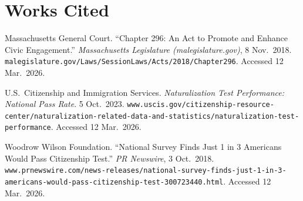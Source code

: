 \documentclass[12pt]{article}
\begin{document}
\section*{Works Cited}

Massachusetts General Court. ``Chapter 296: An Act to Promote and Enhance Civic Engagement.'' \textit{Massachusetts Legislature (malegislature.gov)}, 8 Nov.\ 2018. \texttt{malegislature.gov/Laws/SessionLaws/Acts/2018/Chapter296}. Accessed 12 Mar.\ 2026.

U.S.\ Citizenship and Immigration Services. \textit{Naturalization Test Performance: National Pass Rate}. 5 Oct.\ 2023. \texttt{www.uscis.gov/citizenship-resource-center/naturalization-related-data-and-statistics/naturalization-test-performance}. Accessed 12 Mar.\ 2026.

Woodrow Wilson Foundation. ``National Survey Finds Just 1 in 3 Americans Would Pass Citizenship Test.'' \textit{PR Newswire}, 3 Oct.\ 2018. \texttt{www.prnewswire.com/news-releases/national-survey-finds-just-1-in-3-americans-would-pass-citizenship-test-300723440.html}. Accessed 12 Mar.\ 2026.
\end{document}
